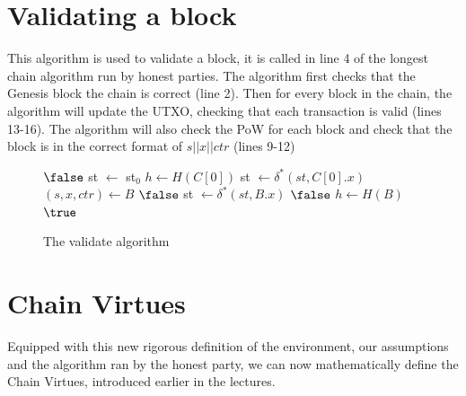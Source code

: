 \section{Validating a block}
This algorithm is used to validate a block, it is called in line 4 of the longest chain algorithm run by honest parties. The algorithm first checks that the Genesis block the chain is correct (line 2). Then for every block in the chain, the algorithm will update the UTXO, checking that each transaction is valid (lines 13-16). The algorithm will also check the PoW for each block and check that the block is in the correct format of $s || x || ctr$ (lines 9-12)
\begin{figure}[H]
\begin{algorithm}[H]
    \caption{\label{alg.validate} The validate algorithm}
    \begin{algorithmic}[1]
         
            \State\Return$\false$
        \EndIf
        \State st $\leftarrow$ st$_0$ 
        \State $h \leftarrow H(C[0])$
        \State st $\leftarrow \delta^*(st, C[0].x)$
         
            \State $(s, x, ctr) \leftarrow B$
             
                \State\Return$\false$
            \EndIf
            \State st $\leftarrow \delta^*(st, B.x)$ 
                \State\Return$\false$
            \EndIf
            \State $h \leftarrow H(B)$
        \EndFor
        \State\Return$\true$
    \EndFunction
    \end{algorithmic}
\end{algorithm}
\end{figure}


\section{Chain Virtues}
Equipped with this new rigorous definition of the environment, our assumptions and the algorithm ran by the honest party, we can now mathematically define the Chain Virtues, introduced earlier in the lectures.

